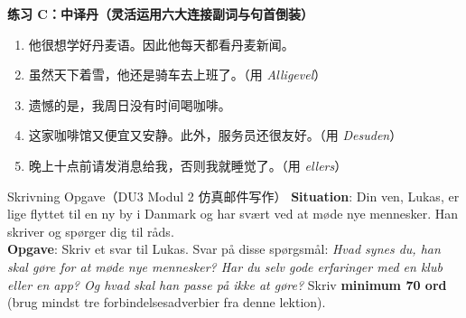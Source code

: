 \textbf{练习 C：中译丹（灵活运用六大连接副词与句首倒装）}
\begin{enumerate}
  \item 他很想学好丹麦语。因此他每天都看丹麦新闻。
  \item 虽然天下着雪，他还是骑车去上班了。（用 \textit{Alligevel}）
  \item 遗憾的是，我周日没有时间喝咖啡。
  \item 这家咖啡馆又便宜又安静。此外，服务员还很友好。（用 \textit{Desuden}）
  \item 晚上十点前请发消息给我，否则我就睡觉了。（用 \textit{ellers}）
\end{enumerate}


\begin{emailbox}{Skrivning Opgave（DU3 Modul 2 仿真邮件写作）}
\textbf{Situation}: Din ven, Lukas, er lige flyttet til en ny by i Danmark og har svært ved at møde nye mennesker. Han skriver og spørger dig til råds.\\
\textbf{Opgave}: Skriv et svar til Lukas. Svar på disse spørgsmål: \textit{Hvad synes du, han skal gøre for at møde nye mennesker? Har du selv gode erfaringer med en klub eller en app? Og hvad skal han passe på ikke at gøre?} Skriv \textbf{minimum 70 ord} (brug mindst tre forbindelsesadverbier fra denne lektion).
\end{emailbox}


